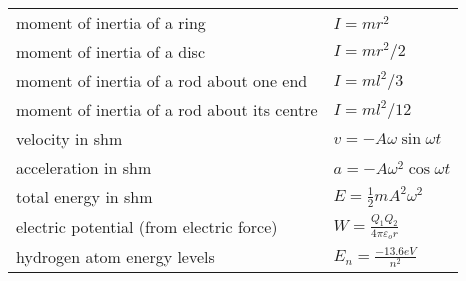 \documentclass[revision-guide.tex]{subfiles}
\begin{document}
\renewcommand*{\arraystretch}{2}
\begin{longtable}{ll}

moment of inertia of a ring & $I = mr^2$\\

moment of inertia of a disc & $I = mr^{2}/2$\\

moment of inertia of a rod about one end & $I = ml^2/3$\\

moment of inertia of a rod about its centre & $I = ml^{2}/12$\\

velocity in shm & $v = -A\omega \sin{\omega t}$\\

acceleration in shm & $a = -A\omega^{2}\cos{\omega t}$\\

total energy in shm & $E = \frac{1}{2}mA^2\omega^2$\\

electric potential (from electric force) &
\(W = \frac{Q_{1}Q_{2}}{4\pi\varepsilon_{o}r}\)\\

hydrogen atom energy levels &\(E_{n} = \frac{- 13.6eV}{n^{2}}\)\\
\end{longtable}
\end{document}
